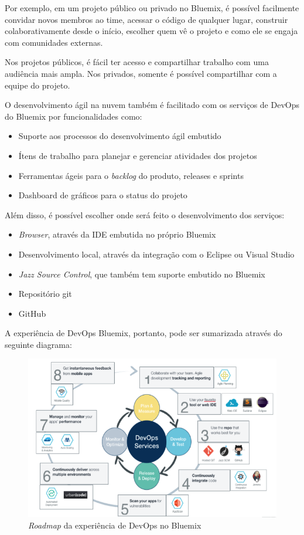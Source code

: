 Por exemplo, em um projeto público ou privado no Bluemix, é possível facilmente convidar novos membros ao time, acessar o código de qualquer lugar, construir colaborativamente desde o início, escolher quem vê o projeto e como ele se engaja com comunidades externas.

Nos projetos públicos, é fácil ter acesso e compartilhar trabalho com uma audiência mais ampla. Nos privados, somente é possível compartilhar com a equipe do projeto.

O desenvolvimento ágil na nuvem também é facilitado com os serviços de DevOps do Bluemix por funcionalidades como:
\begin{itemize}
    \item Suporte aos processos do desenvolvimento ágil embutido
    \item Ítens de trabalho para planejar e gerenciar atividades dos projetos
    \item Ferramentas ágeis para o \textit{backlog} do produto, releases e sprints
    \item Dashboard de gráficos para o status do projeto
\end{itemize}

Além disso, é possível escolher onde será feito o desenvolvimento dos serviços:
\begin{itemize}
  \item \textit{Browser}, através da IDE embutida no próprio Bluemix
  \item Desenvolvimento local, através da integração com o Eclipse ou Visual Studio
  \item \textit{Jazz Source Control}, que também tem suporte embutido no Bluemix
  \item Repositório git
  \item GitHub
\end{itemize}
A experiência de DevOps Bluemix, portanto, pode ser sumarizada através do seguinte diagrama:
\begin{figure}[!htb]
    \centering
    \includegraphics{imagens/roadmap}
    \caption{\textit{Roadmap} da experiência de DevOps no Bluemix}
    \label{Rotulo}
\end{figure}

